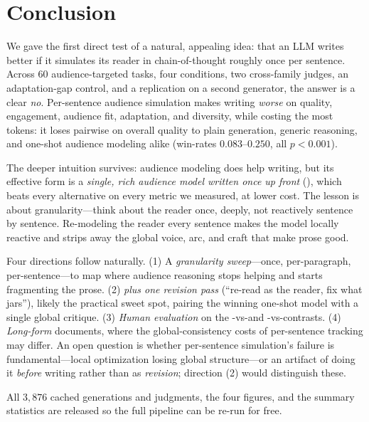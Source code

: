 \section{Conclusion}
\label{sec:conclusion}

We gave the first direct test of a natural, appealing idea: that an LLM writes better if it
simulates its reader in chain-of-thought roughly once per sentence. Across 60 audience-targeted
tasks, four conditions, two cross-family judges, an adaptation-gap control, and a replication on a
second generator, the answer is a clear \emph{no}. Per-sentence audience simulation makes writing
\emph{worse} on quality, engagement, audience fit, adaptation, and diversity, while costing the
most tokens: it loses pairwise on overall quality to plain generation, generic reasoning, and
one-shot audience modeling alike (win-rates $0.083$--$0.250$, all $p<0.001$).

 The deeper intuition survives: audience modeling does help writing, but its
effective form is a \emph{single, rich audience model written once up front} (\simtom), which
beats every alternative on every metric we measured, at lower cost. The lesson is about
granularity---think about the reader once, deeply, not reactively sentence by sentence. Re-modeling
the reader every sentence makes the model locally reactive and strips away the global voice, arc,
and craft that make prose good.

 Four directions follow naturally. (1) A \emph{granularity sweep}---once,
per-paragraph, per-sentence---to map where audience reasoning stops helping and starts fragmenting
the prose. (2) \emph{\simtom plus one revision pass} (``re-read as the reader, fix what jars''),
likely the practical sweet spot, pairing the winning one-shot model with a single global critique.
(3) \emph{Human evaluation} on the \simtom-vs-\plain and \persentence-vs-\simtom contrasts. (4)
\emph{Long-form} documents, where the global-consistency costs of per-sentence tracking may differ.
An open question is whether per-sentence simulation's failure is fundamental---local optimization
losing global structure---or an artifact of doing it \emph{before} writing rather than as
\emph{revision}; direction (2) would distinguish these.

 All $3{,}876$ cached generations and judgments, the four figures, and the
summary statistics are released so the full pipeline can be re-run for free.
